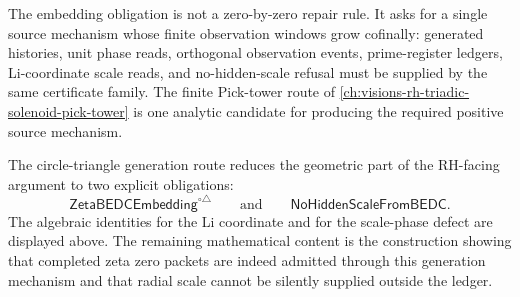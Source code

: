 \begin{principle}
\label{prin:rh-circle-triangle-cofinal-mechanism}
The embedding obligation is not a zero-by-zero repair rule. It asks for a
single source mechanism whose finite observation windows grow cofinally:
generated histories, unit phase reads, orthogonal observation events,
prime-register ledgers, Li-coordinate scale reads, and no-hidden-scale
refusal must be supplied by the same certificate family. The finite
Pick-tower route of
\autoref{ch:visions-rh-triadic-solenoid-pick-tower} is one analytic
candidate for producing the required positive source mechanism.
\end{principle}

\begin{principle}
\label{prin:rh-circle-triangle-generation-status}
The circle-triangle generation route reduces the geometric part of the
RH-facing argument to two explicit obligations:
$$
\mathsf{ZetaBEDCEmbedding}^{\circ\triangle}
\qquad\text{and}\qquad
\mathsf{NoHiddenScaleFromBEDC}.
$$
The algebraic identities for the Li coordinate and for the
scale-phase defect are displayed above. The remaining mathematical
content is the construction showing that completed zeta zero packets are
indeed admitted through this generation mechanism and that radial scale
cannot be silently supplied outside the ledger.
\end{principle}
